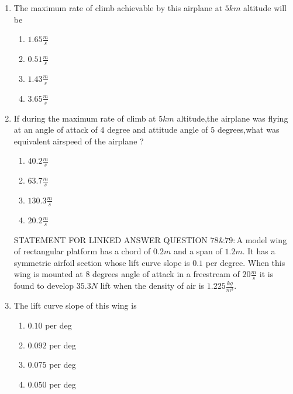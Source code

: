 \documentclass[journal]{IEEEtran}
\begin{document}
\begin{enumerate}
     \item The maximum rate of climb achievable by this airplane at $5 km$ altitude will be
     \begin{enumerate}
         \item $1.65\frac{m}{s}$
         \item $0.51\frac{m}{s}$
         \item $1.43\frac{m}{s}$
         \item $3.65\frac{m}{s}$
     \end{enumerate}
     \item If during the maximum rate of climb at $5km$ altitude,the airplane was flying at an angle of attack of $4$ degree and attitude  angle of $5$ degrees,what was equivalent airspeed of the airplane ?
     \begin{enumerate}
         \item $40.2\frac{m}{s}$
         \item $63.7\frac{m}{s}$
         \item $130.3\frac{m}{s}$
         \item $20.2\frac{m}{s}$
     \end{enumerate}
     STATEMENT FOR LINKED ANSWER QUESTION $78\&79:$A model wing of rectangular platform has a chord of $0.2 m$ and a span of $1.2 m.$ It has a symmetric airfoil section whose lift curve slope is $0.1$ per degree. When this wing is mounted at $8$ degrees angle of attack in a freestream of $20 \frac{m}{s}$ it is found to develop $35.3 N$ lift when the density of air is $1.225 \frac{kg}{m^3}.$
    \item The lift curve slope of this wing is
    \begin{enumerate}
        \item $0.10$ per deg
        \item $0.092$ per deg
        \item $0.075$ per deg
        \item $0.050$ per deg

\end{enumerate}
\end{enumerate}
\end{document}
